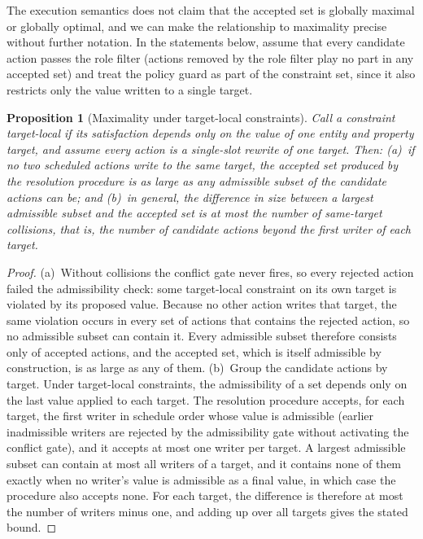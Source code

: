\documentclass{ieeeaccess}
\theoremstyle{definition}
\theoremstyle{plain}
\newtheorem{proposition}{Proposition}
\theoremstyle{remark}
\begin{document}
The execution semantics does not claim that the accepted set is globally maximal or globally optimal, and we can make the relationship to maximality precise without further notation. In the statements below, assume that every candidate action passes the role filter (actions removed by the role filter play no part in any accepted set) and treat the policy guard as part of the constraint set, since it also restricts only the value written to a single target.

\begin{proposition}[Maximality under target-local constraints]
\label{prop:maximality}
Call a constraint \emph{target-local} if its satisfaction depends only on the value of one entity and property target, and assume every action is a single-slot rewrite of one target. Then: (a)~if no two scheduled actions write to the same target, the accepted set produced by the resolution procedure is as large as any admissible subset of the candidate actions can be; and (b)~in general, the difference in size between a largest admissible subset and the accepted set is at most the number of same-target collisions, that is, the number of candidate actions beyond the first writer of each target.
\end{proposition}
\begin{proof}
(a)~Without collisions the conflict gate never fires, so every rejected action failed the admissibility check: some target-local constraint on its own target is violated by its proposed value. Because no other action writes that target, the same violation occurs in every set of actions that contains the rejected action, so no admissible subset can contain it. Every admissible subset therefore consists only of accepted actions, and the accepted set, which is itself admissible by construction, is as large as any of them.
(b)~Group the candidate actions by target. Under target-local constraints, the admissibility of a set depends only on the last value applied to each target. The resolution procedure accepts, for each target, the first writer in schedule order whose value is admissible (earlier inadmissible writers are rejected by the admissibility gate without activating the conflict gate), and it accepts at most one writer per target. A largest admissible subset can contain at most all writers of a target, and it contains none of them exactly when no writer's value is admissible as a final value, in which case the procedure also accepts none. For each target, the difference is therefore at most the number of writers minus one, and adding up over all targets gives the stated bound.
\end{proof}
\end{document}
